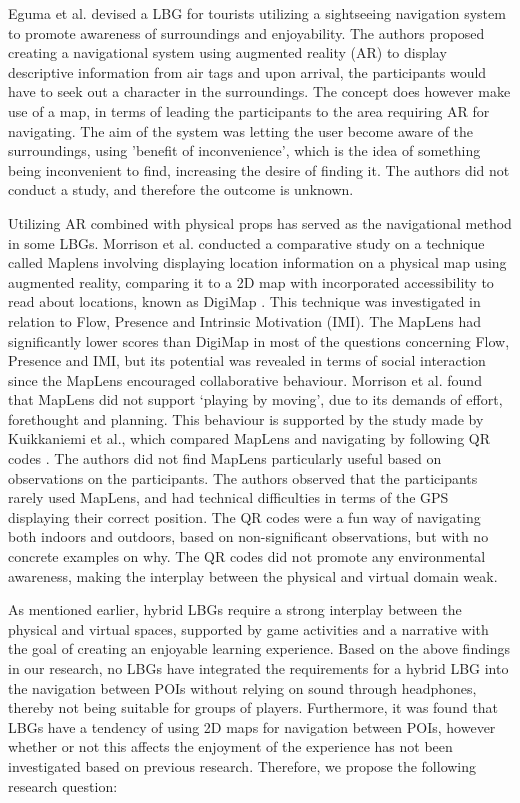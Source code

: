 Eguma et al. devised a LBG for tourists utilizing a sightseeing navigation system to promote awareness of surroundings and enjoyability\cite{HideAndSeek}. The authors proposed creating a navigational system using augmented reality (AR) to display descriptive information from air tags and upon arrival, the participants would have to seek out a character in the surroundings. The concept does however make use of a map, in terms of leading the participants to the area requiring AR for navigating. The aim of the system was letting the user become aware of the surroundings, using 'benefit of inconvenience', which is the idea of something being inconvenient to find, increasing the desire of finding it. The authors did not conduct a study, and therefore the outcome is unknown.

Utilizing AR combined with physical props has served as the navigational method in some LBGs. Morrison et al. conducted a comparative study on a technique called Maplens involving displaying location information on a physical map using augmented reality, comparing it to a 2D map with incorporated accessibility to read about locations, known as DigiMap \cite{Morrison}. This technique was investigated in relation to Flow, Presence and Intrinsic Motivation (IMI). The MapLens had significantly lower scores than DigiMap in most of the questions concerning Flow, Presence and IMI, but its potential was revealed in terms of social interaction since the MapLens encouraged collaborative behaviour.  Morrison et al. found that MapLens did not support ‘playing by moving’, due to its demands of effort, forethought and planning. This behaviour is supported by the study made by Kuikkaniemi et al., which compared MapLens and navigating by following QR codes \cite{LostLab}. The authors did not find MapLens particularly useful based on observations on the participants. The authors observed that the participants rarely used MapLens, and had technical difficulties in terms of the GPS displaying their correct position. The QR codes were a fun way of navigating both indoors and outdoors, based on non-significant observations, but with no concrete examples on why. The QR codes did not promote any environmental awareness, making the interplay between the physical and virtual domain weak. 

As mentioned earlier, hybrid LBGs require a strong interplay between the physical and virtual spaces, supported by game activities and a narrative with the goal of creating an enjoyable learning experience. Based on the above findings in our research, no LBGs have integrated the requirements for a hybrid LBG into the navigation between POIs without relying on sound through headphones, thereby not being suitable for groups of players. Furthermore, it was found that LBGs have a tendency of using 2D maps for navigation between POIs, however whether or not this affects the enjoyment of the experience has not been investigated based on previous research. Therefore, we propose the following research question:

